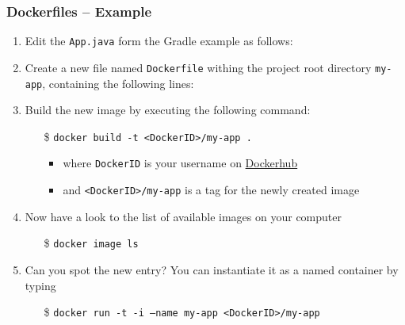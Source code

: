 \documentclass[handout]{beamer}\mode<presentation>{\usetheme{AMSCesenaBleu}}
\begin{document}
\begin{frame}[allowframebreaks]
\frametitle{Dockerfiles -- Example}

    \begin{enumerate}
        \item Edit the \texttt{App.java} form the Gradle example as follows:
        
        
        \framebreak

        \item Create a new file named \alert{\texttt{Dockerfile}} withing the project root directory \alert{\texttt{my-app}}, containing the following lines:
         
        
        \framebreak
        
        \item Build the new image by executing the following command:
        \begin{itemize}
            \item[\$] \texttt{docker \alert{build} -t <DockerID>/my-app \alert{.}}
            \begin{itemize}
                \item where \texttt{DockerID} is your username on \href{https://hub.docker.com/}{Dockerhub}
                \item and \alert{\texttt{<DockerID>/my-app}} is a \alert{tag} for the newly created image
            \end{itemize}
        \end{itemize}
        
        \item Now have a look to the list of available images on your computer
        \begin{itemize}
            \item[\$] \texttt{docker image ls}
        \end{itemize}
        
        \item Can you spot the new entry? You can instantiate it as a \alert{named} container by typing 
        \begin{itemize}
            \item[\$] \texttt{docker run -t -i \alert{--name my-app} <DockerID>/my-app}
        \end{itemize}
        

\end{enumerate}
\end{frame}
\end{document}
